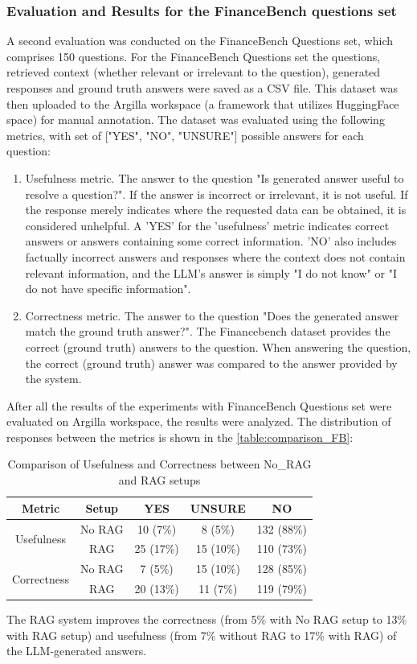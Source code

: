 \subsubsection{Evaluation and Results for the FinanceBench questions set}
A second evaluation was conducted on the FinanceBench Questions set, which comprises 150 questions. For the FinanceBench Questions set the questions, retrieved context (whether relevant or irrelevant to the question), generated responses and ground truth answers were saved as a CSV file. This dataset was then uploaded to the Argilla workspace (a framework that utilizes HuggingFace space) for manual annotation. The dataset was evaluated using the following metrics, with set of ["YES", "NO", "UNSURE"] possible answers for each question:
\begin{enumerate}
\item Usefulness metric. The answer to the question "Is generated answer useful to resolve a question?". If the answer is incorrect or irrelevant, it is not useful. If the response merely indicates where the requested data can be obtained, it is considered unhelpful. A 'YES' for the 'usefulness' metric indicates correct answers or answers containing some correct information. 'NO' also includes factually incorrect answers and responses where the context does not contain relevant information, and the LLM's answer is simply "I do not know" or "I do not have specific information".
\item Correctness metric. The answer to the question "Does the generated answer match the ground truth answer?". The Financebench dataset provides the correct (ground truth) answers to the question. When answering the question, the correct (ground truth) answer was compared to the answer provided by the system.
\end{enumerate}

After all the results of the experiments with FinanceBench Questions set were evaluated on Argilla workspace, the results were analyzed. The distribution of responses between the metrics is shown in the \autoref{table:comparison_FB}:
\begin{table}[H]
\centering
\begin{tabular}{|c|c|c|c|c|}
\hline
\textbf{Metric} & \textbf{Setup} & \textbf{YES} & \textbf{UNSURE} & \textbf{NO} \\ 
\hline
\multirow{2}{*}{Usefulness} & No RAG & 10 (7\%) & 8 (5\%) & 132 (88\%) \\ \cline{2-5}
 & RAG & 25 (17\%) & 15 (10\%) & 110 (73\%) \\
\hline
\multirow{2}{*}{Correctness} & No RAG & 7 (5\%) & 15 (10\%) & 128 (85\%) \\ \cline{2-5}
 & RAG & 20 (13\%) & 11 (7\%) & 119 (79\%) \\
\hline
\end{tabular}
\caption{Comparison of Usefulness and Correctness between No\_RAG and RAG setups}
\label{table:comparison_FB}
\end{table}
The RAG system improves the correctness (from 5\% with No RAG setup to 13\% with RAG setup) and usefulness (from 7\% without RAG to 17\% with RAG) of the LLM-generated answers.

